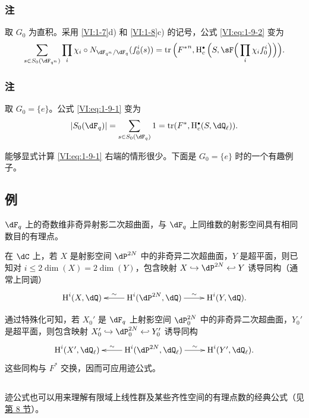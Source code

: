 \addtocounter{subsubsection}{2}
\subsubsection{注}\label{VI:1-9-3}

取 $G_0$ 为直积。采用 \ref{VI:1-7}d) 和 \ref{VI:1-8}c) 的记号，公式 \eqref{VI:eq:1-9-2} 变为
\[
  \sum_{s\in S_0(\dF_{q^n})} \prod_i \chi_i\circ N_{\dF_{q^n}/\dF_q} (f_0^i(s)) = \tr\Big({F^\ast}^n, \h_c^\bullet\Big(S,\sF\Big(\prod_i \chi_i f_0^i\Big)\Big)\Big) \text{.}
\]

\subsubsection{注}\label{VI:1-9-4}

取 $G_0=\{e\}$。公式 \eqref{VI:eq:1-9-1} 变为
\[
  \left|S_0(\dF_q)\right| = \sum_{s\in S_0(\dF_q)} 1 = \tr(F^\ast,\h_c^\bullet(S,\dQ_\ell)) \text{.}
\]

能够显式计算 \eqref{VI:eq:1-9-1} 右端的情形很少。下面是 $G_0=\{e\}$ 时的一个有趣例子。

\subsection{例}\label{VI:1-10}

\texorpdfstring{$\dF_q$}{Fq} 上的奇数维非奇异射影二次超曲面，与 \texorpdfstring{$\dF_q$}{Fq} 上同维数的射影空间具有相同数目的有理点。

在 $\dC$ 上，若 $X$ 是射影空间 $\dP^{2 N}$ 中的非奇异二次超曲面，$Y$ 是超平面，则已知对 $i\leqslant 2\dim(X)=2\dim(Y)$，包含映射 $X\hookrightarrow \dP^{2 N}\hookleftarrow Y$ 诱导同构（通常上同调）
\[\xymatrix{
  \h^i(X,\dQ)
    & \ar[l]_-\sim \h^i(\dP^{2 N},\dQ) \ar[r]^-\sim
    & \h^i(Y,\dQ) \text{.}
}\]

通过特殊化可知，若 $X_0'$ 是 $\dF_q$ 上射影空间 $\dP_0^{2 N}$ 中的非奇异二次超曲面，$Y_0'$ 是超平面，则包含映射 $X_0'\hookrightarrow \dP_0^{2 N}\hookleftarrow Y_0'$ 诱导同构
\[\xymatrix{
  \h^i(X',\dQ_\ell)
    & \ar[l]_-\sim \h^i(\dP^{2 N},\dQ_\ell) \ar[r]^-\sim
    & \h^i(Y',\dQ_\ell) \text{.}
}\]
这些同构与 $F^\ast$ 交换，因而可应用迹公式。

\subsection{}\label{VI:1-11}

迹公式也可以用来理解有限域上线性群及某些齐性空间的有理点数的经典公式（见\hyperref[VI:8]{第 8 节}）。

